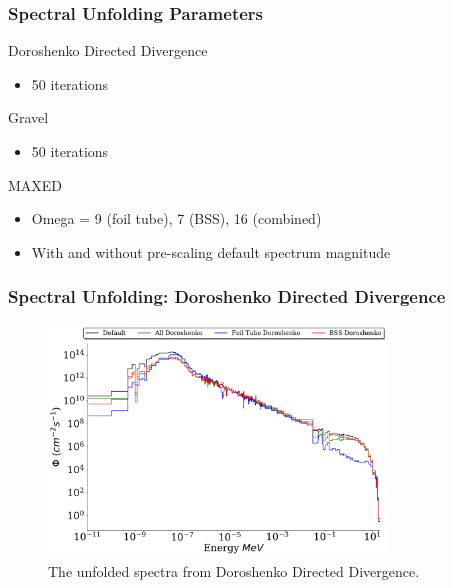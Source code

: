 \documentclass[fleqn]{beamer}
\begin{document}
\begin{frame}
\frametitle{Spectral Unfolding Parameters}

Doroshenko Directed Divergence
\begin{itemize}
\item 50 iterations
\end{itemize}

Gravel
\begin{itemize}
\item 50 iterations
\end{itemize}

MAXED
\begin{itemize}
\item Omega = 9 (foil tube), 7 (BSS), 16 (combined)
\item With and without pre-scaling default spectrum magnitude
\end{itemize}

\end{frame}

\begin{frame}
\frametitle{Spectral Unfolding: Doroshenko Directed Divergence}

\begin{figure}
\centering
\includegraphics[width = 0.8\textwidth]{unfolded_do}
\caption{The unfolded spectra from Doroshenko Directed Divergence.}
\end{figure}

\end{frame}
\end{document}
